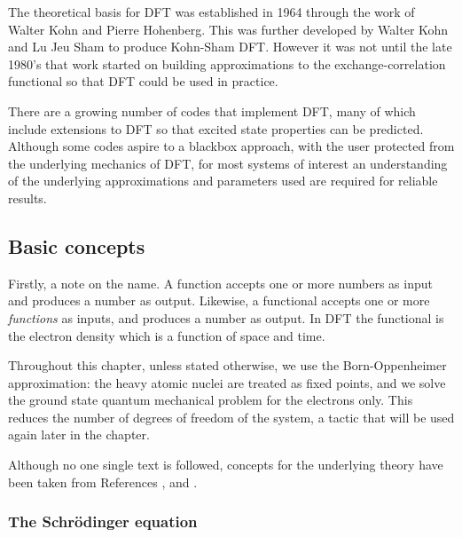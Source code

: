 The theoretical basis for DFT was established in 1964 through the work of Walter Kohn and Pierre Hohenberg.\autocite{Hohenberg1964} This was further developed by Walter Kohn and Lu Jeu Sham to produce Kohn-Sham DFT.\autocite{Kohn1965} However it was not until the late 1980's that work started on building approximations to the exchange-correlation functional so that DFT could be used in practice. 

There are a growing number of codes that implement DFT, many of which include extensions to DFT so that excited state properties can be predicted.
Although some codes aspire to a blackbox approach, with the user protected from the underlying mechanics of DFT, for most systems of interest an understanding of the underlying approximations and parameters used are required for reliable results.

\subsection{Basic concepts} %

Firstly, a note on the name. A function accepts one or more numbers as input and produces a number as output. Likewise, a functional accepts one or more \textit{functions} as inputs, and produces a number as output. In DFT the functional is the electron density which is a function of space and time.

Throughout this chapter, unless stated otherwise, we use the Born-Oppenheimer approximation: the heavy atomic nuclei are treated as fixed points, and we solve the ground state quantum mechanical problem for the electrons only. This reduces the number of degrees of freedom of the system, a tactic that will be used again later in the chapter.

Although no one single text is followed, concepts for the underlying theory have been taken from References \cite{Burke2007}, \cite{Scuseria05} and \cite{Perdew2010}.


\subsubsection{The Schr\"{o}dinger equation}

